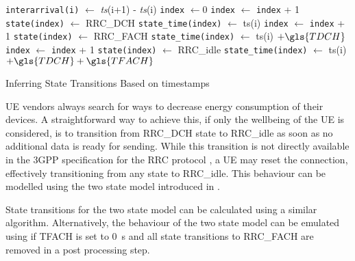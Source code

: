 \begin{algorithm}
  \begin{algorithmic}
    \State \texttt{interarrival(i)} $\leftarrow$ \emph{ts}(i+1) - \emph{ts}(i)
    \State \texttt{index} $\leftarrow 0$
        \State \texttt{index} $\leftarrow$ \texttt{index} + 1
        \State \texttt{state(index)} $\leftarrow$ \gls{RRC_DCH}
        \State \texttt{state\_time(index)} $\leftarrow$ ts(i)
      \EndIf
        \State \texttt{index} $\leftarrow$ \texttt{index} + 1
        \State \texttt{state(index)} $\leftarrow$ \gls{RRC_FACH}
        \State \texttt{state\_time(index)} $\leftarrow$ ts(i) $+ \gls{TDCH}$
      \EndIf
        \State \texttt{index} $\leftarrow$ \texttt{index} + 1
        \State \texttt{state(index)} $\leftarrow$ \gls{RRC_idle}
        \State \texttt{state\_time(index)} $\leftarrow$ ts(i) $+ \gls{TDCH} + \gls{TFACH}$
      \EndIf
    \EndFor
  \end{algorithmic}
  \caption{Inferring  State Transitions Based on  timestamps}
  \label{alg:network:network_traces:performance_evaluation:inferring_network_state:inference_algorithm}
\end{algorithm}

\gls{UE} vendors always search for ways to decrease energy consumption of their devices.
A straightforward way to achieve this, if only the wellbeing of the \gls{UE} is considered, is to transition from \gls{RRC_DCH} state to \gls{RRC_idle} as soon as no additional data is ready for sending.
While this transition is not directly available in the 3GPP specification for the \gls{RRC} protocol \cite{3GPP_RRC_Spec}, a \gls{UE} may reset the connection, effectively transitioning from any state to \gls{RRC_idle}.
This behaviour can be modelled using the two state model introduced in .

State transitions for the two state model can be calculated using a similar algorithm.
Alternatively, the behaviour of the two state model can be emulated using  if \gls{TFACH} is set to \SI{0}{\second} and all state transitions to \gls{RRC_FACH} are removed in a post processing step.

